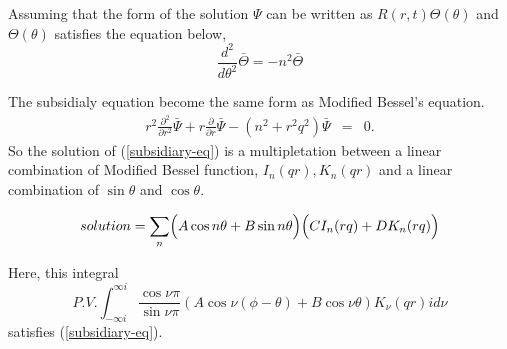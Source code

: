 \documentclass{article}
\begin{document}
Assuming that the form of the solution $\Psi$ can be written as
 $R(r, t)\Theta(\theta)$ and $\Theta(\theta)$ satisfies the equation below, 
\begin{equation}
    \frac{d^2}{d\theta^2}\bar{\Theta} = -n^2\bar{\Theta}
\end{equation}

The subsidialy equation become the same form as Modified Bessel's equation.
\begin{eqnarray} \label{subsidiary-eq}
    r^2\frac{\partial^2}{\partial r^2}\bar{\Psi} +
    r\frac{\partial}{\partial r}\bar{\Psi} -(n^2 + r^2q^2)\bar{\Psi} &=& 0.
\end{eqnarray}
So the solution of (\ref{subsidiary-eq}) is a multipletation between
 a linear combination of Modified Bessel function, $I_n(qr), K_n(qr)$ and
 a linear combination of $\sin\theta$ and $\cos\theta$.

\begin{equation}\label{solution-of-subsidialy-equation}
    solution = \sum_n\Bigl( A\cos n\theta + B\sin n\theta\Bigr)
    \Bigl(CI_n(rq) + DK_n(rq)\Bigr)
\end{equation}

Here, this integral
\begin{equation}\label{general-integral-form-of-w}
P.V.\int^{\infty i}_{-\infty i}
    \frac{\cos\nu\pi}{\sin\nu\pi}
    (A\cos\nu(\phi - \theta) + B\cos\nu\theta)
    K_\nu(qr)id\nu
\end{equation}
satisfies (\ref{subsidiary-eq}).
\end{document}
